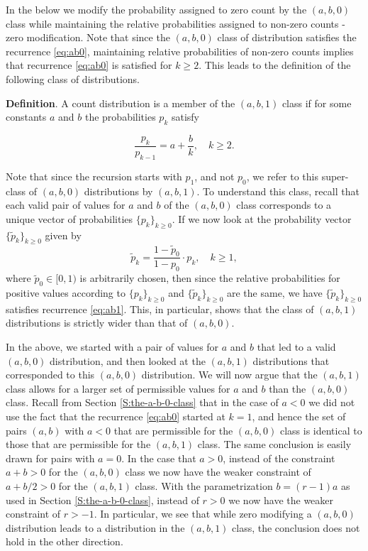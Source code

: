 \documentclass[]{book}
\theoremstyle{definition}
\theoremstyle{definition}
\theoremstyle{definition}
\theoremstyle{remark}
\begin{document}
In the below we modify the probability assigned to zero count by the
\((a,b,0)\) class while maintaining the relative probabilities assigned
to non-zero counts - zero modification. Note that since the \((a,b,0)\)
class of distribution satisfies the recurrence \eqref{eq:ab0}, maintaining
relative probabilities of non-zero counts implies that recurrence
\eqref{eq:ab0} is satisfied for \(k\geq 2\). This leads to the definition
of the following class of distributions.

\textbf{Definition}. A count distribution is a member of the
\((a, b, 1)\) class if for some constants \(a\) and \(b\) the
probabilities \(p_k\) satisfy

\begin{equation}
\frac{p_k}{p_{k-1}}=a+\frac{b}{k},\quad k\geq 2.
\label{eq:ab1}
\end{equation}

Note that since the recursion starts with \(p_1\), and not \(p_0\), we
refer to this super-class of \((a,b,0)\) distributions by \((a,b,1)\).
To understand this class, recall that each valid pair of values for
\(a\) and \(b\) of the \((a,b,0)\) class corresponds to a unique vector
of probabilities \(\{p_k\}_{k\geq 0}\). If we now look at the
probability vector \(\{\tilde{p}_k\}_{k\geq 0}\) given by \[
\tilde{p}_k= \frac{1-\tilde{p}_0}{1-p_0}\cdot p_k, \quad k\geq 1,
\] where \(\tilde{p}_0\in[0,1)\) is arbitrarily chosen, then since the
relative probabilities for positive values according to
\(\{p_k\}_{k\geq 0}\) and \(\{\tilde{p}_k\}_{k\geq 0}\) are the same, we
have \(\{\tilde{p}_k\}_{k\geq 0}\) satisfies recurrence \eqref{eq:ab1}.
This, in particular, shows that the class of \((a,b,1)\) distributions
is strictly wider than that of \((a,b,0)\).

In the above, we started with a pair of values for \(a\) and \(b\) that
led to a valid \((a,b,0)\) distribution, and then looked at the
\((a,b,1)\) distributions that corresponded to this \((a,b,0)\)
distribution. We will now argue that the \((a,b,1)\) class allows for a
larger set of permissible values for \(a\) and \(b\) than the
\((a,b,0)\) class. Recall from Section \ref{S:the-a-b-0-class} that in
the case of \(a<0\) we did not use the fact that the recurrence
\eqref{eq:ab0} started at \(k=1\), and hence the set of pairs \((a,b)\)
with \(a<0\) that are permissible for the \((a,b,0)\) class is identical
to those that are permissible for the \((a,b,1)\) class. The same
conclusion is easily drawn for pairs with \(a=0\). In the case that
\(a>0\), instead of the constraint \(a+b>0\) for the \((a,b,0)\) class
we now have the weaker constraint of \(a+b/2>0\) for the \((a,b,1)\)
class. With the parametrization \(b=(r-1)a\) as used in Section
\ref{S:the-a-b-0-class}, instead of \(r>0\) we now have the weaker
constraint of \(r>-1\). In particular, we see that while zero modifying
a \((a,b,0)\) distribution leads to a distribution in the \((a,b,1)\)
class, the conclusion does not hold in the other direction.
\end{document}
